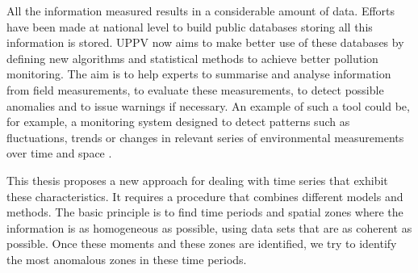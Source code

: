 All the information measured results in a considerable amount of data. Efforts have been made at national level to build public databases storing all this information is stored. UPPV now aims to make better use of these databases by defining new algorithms and statistical methods to achieve better pollution monitoring. The aim is to help experts to summarise and analyse information from field measurements, to evaluate these measurements, to detect possible anomalies and to issue warnings if necessary. An example of such a tool could be, for example, a monitoring system designed to detect patterns such as fluctuations, trends or changes in relevant series of environmental measurements over time and space \citep{Manly2008}.

This thesis proposes a new approach for dealing with time series that exhibit these characteristics. It requires a procedure that combines different models and methods. The basic principle is to find time periods and spatial zones where the information is as homogeneous as possible, using data sets that are as coherent as possible. Once these moments and these zones are identified, we try to identify the most anomalous zones in these time periods. 





